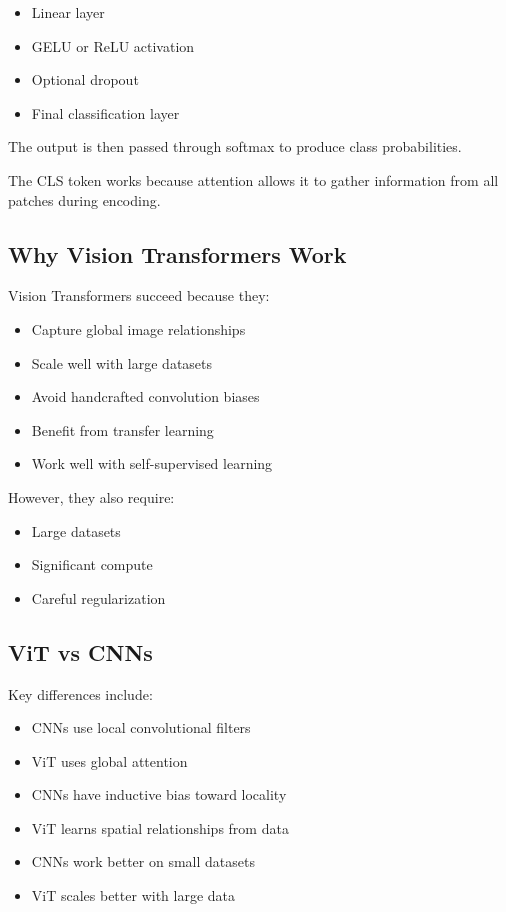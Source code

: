 \documentclass[11pt]{article}
\begin{document}
\begin{itemize}

\item Linear layer
\item GELU or ReLU activation
\item Optional dropout
\item Final classification layer

\end{itemize}

The output is then passed through softmax to produce class probabilities.

The CLS token works because attention allows it to gather information from all patches during encoding.

\subsection{Why Vision Transformers Work}

Vision Transformers succeed because they:

\begin{itemize}

\item Capture global image relationships
\item Scale well with large datasets
\item Avoid handcrafted convolution biases
\item Benefit from transfer learning
\item Work well with self-supervised learning

\end{itemize}

However, they also require:

\begin{itemize}

\item Large datasets
\item Significant compute
\item Careful regularization

\end{itemize}

\subsection{ViT vs CNNs}

Key differences include:

\begin{itemize}

\item CNNs use local convolutional filters
\item ViT uses global attention
\item CNNs have inductive bias toward locality
\item ViT learns spatial relationships from data
\item CNNs work better on small datasets
\item ViT scales better with large data

\end{itemize}
\end{document}
